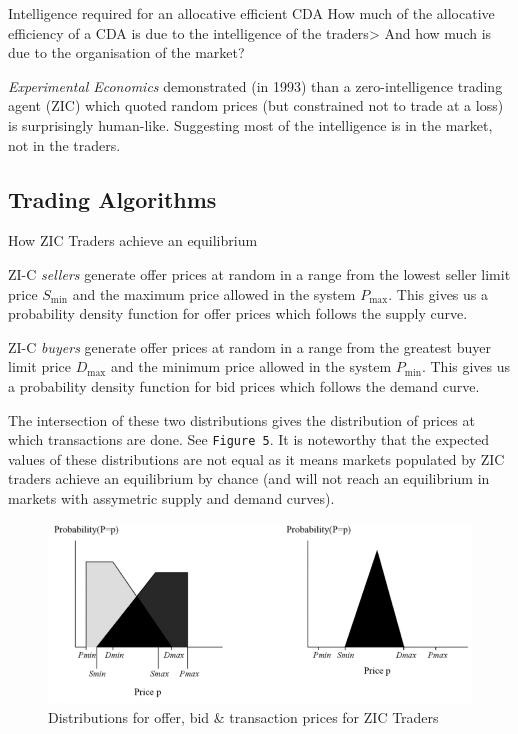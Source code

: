 \documentclass[11pt,a4paper]{article}
\begin{document}
\begin{proposition}{Intelligence required for an allocative efficient CDA}
  How much of the allocative efficiency of a CDA is due to the intelligence of the traders> And how much is due to the organisation of the market?
  \par \textit{Experimental Economics} demonstrated (in 1993) than a zero-intelligence trading agent (ZIC) which quoted random prices (but constrained not to trade at a loss) is surprisingly human-like. Suggesting most of the intelligence is in the market, not in the traders.
\end{proposition}

\subsection{Trading Algorithms}

\begin{proposition}{How ZIC Traders achieve an equilibrium}
  \par ZI-C \textit{sellers} generate offer prices at random in a range from the lowest seller limit price $S_\text{min}$ and the maximum price allowed in the system $P_\text{max}$. This gives us a probability density function for offer prices which follows the supply curve.
  \par ZI-C \textit{buyers} generate offer prices at random in a range from the greatest buyer limit price $D_\text{max}$ and the minimum price allowed in the system $P_\text{min}$. This gives us a probability density function for bid prices which follows the demand curve.
  \par The intersection of these two distributions gives the distribution of prices at which transactions are done. See \texttt{Figure 5}. It is noteworthy that the expected values of these distributions are not equal as it means markets populated by ZIC traders achieve an equilibrium by chance (and will not reach an equilibrium in markets with assymetric supply and demand curves).
\end{proposition}

\begin{figure}[ht!]
  \centering
  \includegraphics[width=.5\textwidth]{ZICTransactions.PNG}
  \caption{Distributions for offer, bid \& transaction prices for ZIC Traders}
\end{figure}
\end{document}
